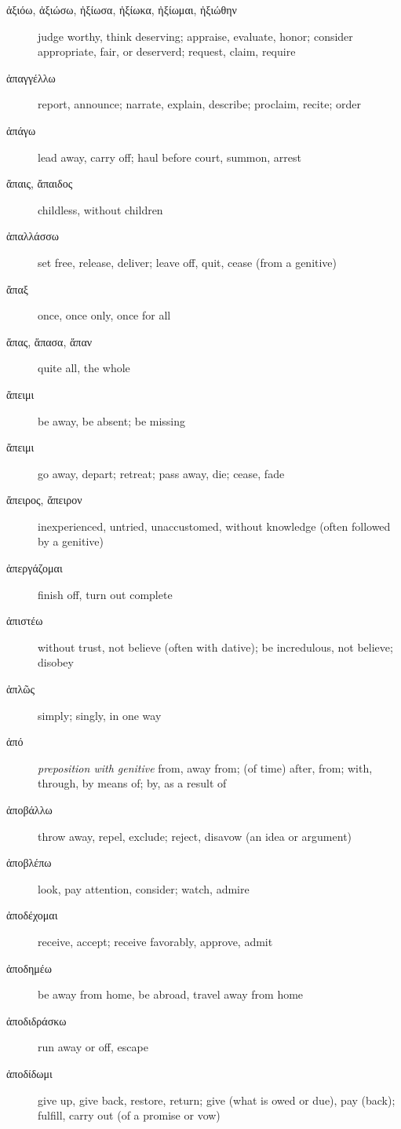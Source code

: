 \documentclass[12pt,letterpaper]{article}
\begin{document}
\begin{description}
    \item[\textgreek{ἀξιόω, ἀξιώσω, ἠξίωσα, ἠξίωκα, ἠξίωμαι, ἠξιώθην}] \marginnote{*}judge worthy, think deserving; appraise, evaluate, honor; consider appropriate, fair, or deserverd; request, claim, require
    \item[\textgreek{ἀπαγγέλλω}] report, announce; narrate, explain, describe; proclaim, recite; order
    \item[\textgreek{ἀπάγω}] lead away, carry off; haul before court, summon, arrest
    \item[\textgreek{ἄπαις, ἄπαιδος}] childless, without children
    \item[\textgreek{ἀπαλλάσσω}] set free, release, deliver; leave off, quit, cease (from a genitive)
    \item[\textgreek{ἄπαξ}] once, once only, once for all
    \item[\textgreek{ἅπας, ἅπασα, ἅπαν}] \marginnote{*}quite all, the whole
    \item[\textgreek{ἄπειμι}] be away, be absent; be missing
    \item[\textgreek{ἄπειμι}] go away, depart; retreat; pass away, die; cease, fade
    \item[\textgreek{ἄπειρος, ἄπειρον}] inexperienced, untried, unaccustomed, without knowledge (often followed by a genitive)
    \item[\textgreek{ἀπεργάζομαι}] finish off, turn out complete
    \item[\textgreek{ἀπιστέω}] without trust, not believe (often with dative); be incredulous, not believe; disobey
    \item[\textgreek{ἁπλῶς}] \marginnote{*}simply; singly, in one way
    \item[\textgreek{ἀπό}] \marginnote{*}\textit{preposition with genitive} from, away from; (of time) after, from; with, through, by means of; by, as a result of
    \item[\textgreek{ἀποβάλλω}] throw away, repel, exclude; reject, disavow (an idea or argument)
    \item[\textgreek{ἀποβλέπω}] look, pay attention, consider; watch, admire
    \item[\textgreek{ἀποδέχομαι}] receive, accept; receive favorably, approve, admit
    \item[\textgreek{ἀποδημέω}] be away from home, be abroad, travel away from home
    \item[\textgreek{ἀποδιδράσκω}] run away or off, escape
    \item[\textgreek{ἀποδίδωμι}] give up, give back, restore, return; give (what is owed or due), pay (back); fulfill, carry out (of a promise or vow)

\end{description}
\end{document}

